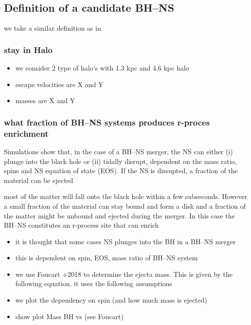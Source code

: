 \documentclass[a4paper,fleqn,usenatbib,useAMS,usedcolumn]{mnras}
\begin{document}
\subsection{Definition of a candidate BH--NS}
we take a similar definition as in 




\subsubsection{stay in Halo}
\begin{itemize}
	\item we consider 2 type of halo`s with 1.3 kpc and 4.6 kpc halo
	\item escape velocities are X and Y 
	\item masses are X and Y 
\end{itemize}

\subsubsection{what fraction of BH--NS systems produces r-proces enrichment}
\label{subsec:EMcounterparts}
%
Simulations show that, in the case of a BH--NS merger, the NS can either (i) plunge into the black hole or (ii) tidally disrupt, dependent on the mass ratio, spins and NS equation of state (EOS). If the NS is dirsupted, a fraction of the material can be ejected 

 most of the matter will fall onto the black hole within a few subseconds. However a small fraction of the material can stay bound and form a disk and a fraction of the matter might be unbound and ejected during the merger. In this case the BH--NS constitutes an r-process site that can enrich 


\begin{itemize}
	\item it is thought that some cases NS plunges into the BH in a BH--NS merger
	\item this is dependent on spin, EOS, mass ratio of BH--NS system
	\item we use Foucart +2018 to determine the ejecta mass. This is given by the following equation. it uses the following assumptions 
	\item we plot the dependency on spin (and how much mass is ejected) 
	\item show plot Mass BH vs (see Foucart) 
\end{itemize}
\end{document}
